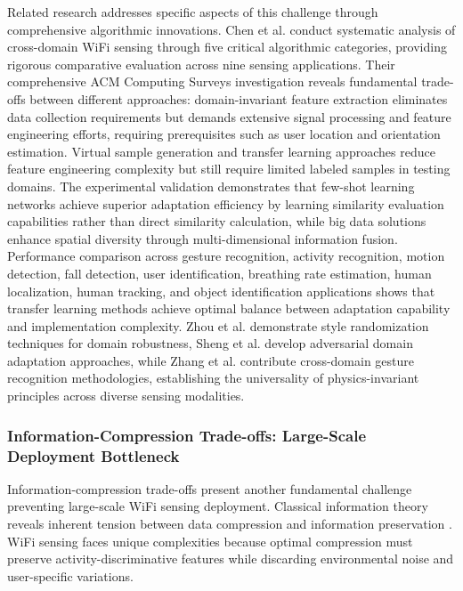 \documentclass[journal]{IEEEtran}
\begin{document}
Related research addresses specific aspects of this challenge through comprehensive algorithmic innovations. Chen et al. \cite{chen2023cross} conduct systematic analysis of cross-domain WiFi sensing through five critical algorithmic categories, providing rigorous comparative evaluation across nine sensing applications. Their comprehensive ACM Computing Surveys investigation reveals fundamental trade-offs between different approaches: domain-invariant feature extraction eliminates data collection requirements but demands extensive signal processing and feature engineering efforts, requiring prerequisites such as user location and orientation estimation. Virtual sample generation and transfer learning approaches reduce feature engineering complexity but still require limited labeled samples in testing domains. The experimental validation demonstrates that few-shot learning networks achieve superior adaptation efficiency by learning similarity evaluation capabilities rather than direct similarity calculation, while big data solutions enhance spatial diversity through multi-dimensional information fusion. Performance comparison across gesture recognition, activity recognition, motion detection, fall detection, user identification, breathing rate estimation, human localization, human tracking, and object identification applications shows that transfer learning methods achieve optimal balance between adaptation capability and implementation complexity. Zhou et al. \cite{zhou2024mixstyle} demonstrate style randomization techniques for domain robustness, Sheng et al. \cite{sheng2024cdfi} develop adversarial domain adaptation approaches, while Zhang et al. \cite{zhang2021wifi} contribute cross-domain gesture recognition methodologies, establishing the universality of physics-invariant principles across diverse sensing modalities.

\subsubsection{Information-Compression Trade-offs: Large-Scale Deployment Bottleneck}

Information-compression trade-offs present another fundamental challenge preventing large-scale WiFi sensing deployment. Classical information theory reveals inherent tension between data compression and information preservation \cite{cover1999elements}. WiFi sensing faces unique complexities because optimal compression must preserve activity-discriminative features while discarding environmental noise and user-specific variations.
\end{document}
